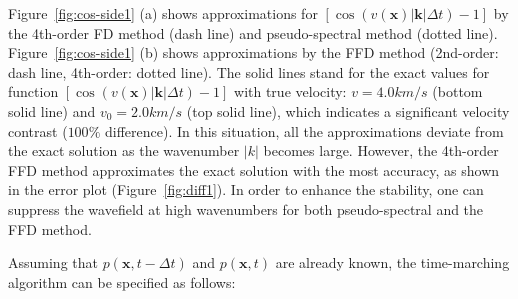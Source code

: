 Figure~\ref{fig:cos-side1} (a) shows approximations for $[\cos(v(\mathbf{x})|\mathbf{k}|\Delta t)-1]$  
by the 4th-order FD method (dash line) and pseudo-spectral method (dotted line). Figure~\ref{fig:cos-side1} (b) shows approximations by the FFD method (2nd-order: dash line, 4th-order: dotted line). 
The solid lines stand for the exact values for function $[\cos(v(\mathbf{x})|\mathbf{k}|\Delta t)-1]$ with true velocity: $v=4.0 km/s$ (bottom solid line) and $v_0=2.0 km/s$ (top solid line), which indicates a significant velocity contrast ($100\%$ difference).
In this situation, all the approximations deviate from the exact solution as the wavenumber $|k|$ becomes large.
However, the 4th-order FFD method approximates the exact solution with the most accuracy, as shown in the error plot (Figure~\ref{fig:diff1}).
In order to enhance the stability, one can suppress the wavefield at high wavenumbers for both pseudo-spectral and the FFD method. 



Assuming that $p(\mathbf{x},t-\Delta t)$ and $p(\mathbf{x},t)$ are already known, the time-marching algorithm can be specified as follows:

